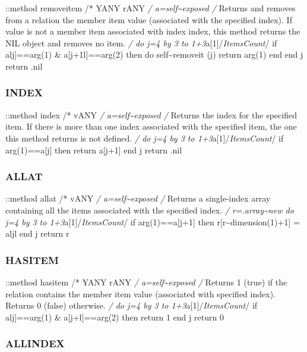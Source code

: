::method removeitem /* YANY rANY \emph{/ a=self\textasciitilde exposed
/} Returns and removes from a relation the member item value (associated
with the specified index). If value is not a member item associated with
index index, this method returns the NIL object and removes no item.
\emph{/ do j=4 by 3 to 1+3}a{[}1{]}/\emph{ItemsCount}/ if alj{]}==arg(1)
\& a{[}j+1l{]}==arg(2) then do self\textasciitilde removeit (j) return
arg(1) end end j return .nil

\hypertarget{index}{%
\subsubsection{INDEX}\label{index}}

::method index /* vANY \emph{/ a=self\textasciitilde exposed /} Returns
the index for the specified item. If there is more than one index
associated with the specified item, the one this method returns is not
defined. \emph{/ do j=4 by 3 to 1+3}a{[}1{]}/\emph{ItemsCount}/ if
arg(1)==a{[}j{]} then return a{[}j+1{]} end j return .nil

\hypertarget{allat}{%
\subsubsection{ALLAT}\label{allat}}

::method allat /* vANY \emph{/ a=self\textasciitilde exposed /} Returns
a single-index array containing all the items associated with the
specified index. \emph{/ r=.array\textasciitilde new do j=4 by 3 to
1+3}a{[}1{]}/\emph{ItemsCount}/ if arg(1)==a{[}j+1{]} then
r{[}r\textasciitilde dimension(1)+1{]} = aljl end j return r

\hypertarget{hasitem}{%
\subsubsection{HASITEM}\label{hasitem}}

::method hasitem /* YANY rANY \emph{/ a=self\textasciitilde exposed /}
Returns 1 (true) if the relation contains the member item value
(associated with specified index). Returns 0 (false) otherwise. \emph{/
do j=4 by 3 to 1+3}a{[}1{]}/\emph{ItemsCount}/ if alj{]}==arg(1) \&
a{[}j+l{]}==arg(2) then return 1 end j return 0

\hypertarget{allindex}{%
\subsubsection{ALLINDEX}\label{allindex}}

